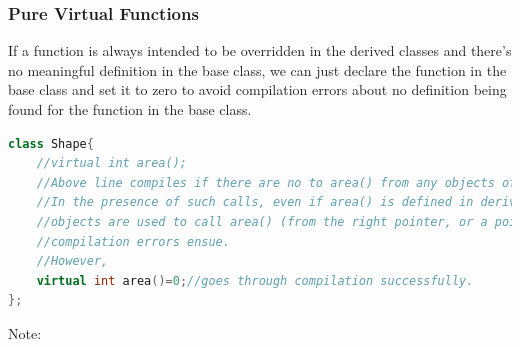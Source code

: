 \documentclass{report}
\begin{document}
\subsubsection{Pure Virtual Functions}
If a function is always intended to be overridden in the derived classes and there's no meaningful definition in the base class,
we can just declare the function in the base class and set it to zero to avoid compilation errors about no definition being found for
the function in the base class.
\begin{lstlisting}[language=C++]
class Shape{
    //virtual int area();
    //Above line compiles if there are no to area() from any objects of shape/derived classes.
    //In the presence of such calls, even if area() is defined in derived classes and their
    //objects are used to call area() (from the right pointer, or a pointer of type Shape*)
    //compilation errors ensue.
    //However,
    virtual int area()=0;//goes through compilation successfully.
};
\end{lstlisting}
Note:
\end{document}
